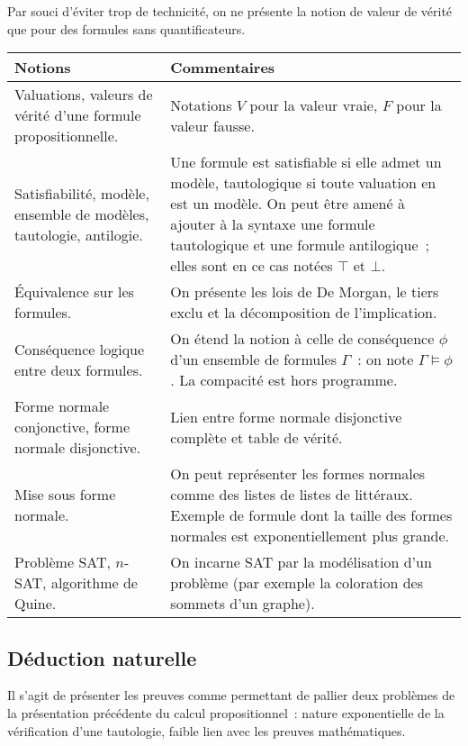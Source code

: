 Par souci d'éviter trop de technicité, on ne présente la notion de valeur
de vérité que pour des formules sans quantificateurs.

\begin{longtable}{|p{\lnotion}|p{\comment}|}
    \hline
    \textbf{Notions} & \textbf{Commentaires} \\
    \hline \hline
    Valuations, valeurs de vérité d'une formule 
    propositionnelle.
    & Notations $V$ pour la valeur vraie, $F$ pour la valeur fausse. \\
Satisfiabilité, modèle, ensemble de modèles, tautologie, antilogie. & Une formule est satisfiable si elle admet un modèle, tautologique si toute valuation en est un modèle. On peut être amené à ajouter à la syntaxe une formule tautologique et une formule antilogique~; elles sont en ce cas notées $\top$ et $\bot$. 
    \\
    \'Equivalence sur les formules. & On présente les lois de De Morgan, le tiers exclu
    et la décomposition de l'implication. 
    \\
    Conséquence logique entre deux formules. & On étend la notion à celle de conséquence $\phi$ d'un ensemble de formules $\Gamma$~: on note $\Gamma\models\phi$. La compacité est hors programme. 
    \\
    \hline
    Forme normale conjonctive, forme normale disjonctive. 
    & Lien entre forme normale disjonctive complète et table de vérité. 
    \\
    Mise sous forme normale. & On peut représenter les formes normales
    comme des listes de listes de littéraux. Exemple de formule dont la taille des formes
    normales est exponentiellement plus grande. 
    \\
    \hline
    Problème SAT, $n$-SAT, algorithme de Quine. & On incarne SAT par la modélisation d'un problème (par exemple la coloration des sommets d'un graphe). %
    \\
    \hline 
\end{longtable}

\clearpage

\subsection{Déduction naturelle \semTroisQuatre}

Il s'agit de présenter les preuves comme permettant de pallier 
deux problèmes de la présentation précédente du calcul propositionnel~: nature
exponentielle de la vérification d'une tautologie, faible lien avec les preuves
mathématiques.

